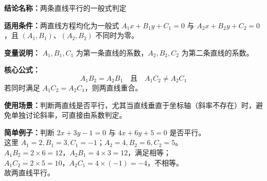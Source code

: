 \textbf{结论名称：}两条直线平行的一般式判定

\textbf{适用条件：}两直线方程均化为一般式 \(A_1x+B_1y+C_1=0\) 与 \(A_2x+B_2y+C_2=0\)，且 \((A_1,B_1)\)、\((A_2,B_2)\) 不同时为零。

\textbf{变量说明：} \(A_1,B_1,C_1\) 为第一条直线的系数，\(A_2,B_2,C_2\) 为第二条直线的系数。

\textbf{核心公式：}
\[
\boxed{ A_1B_2 = A_2B_1 \quad \text{且} \quad A_1C_2 \neq A_2C_1 }
\]
若同时满足 \(A_1C_2 = A_2C_1\)，则两直线重合。

\textbf{使用场景：}判断两直线是否平行，尤其当直线垂直于坐标轴（斜率不存在）时，避免单独讨论斜率，可直接由系数判定。

\textbf{简单例子：}判断 \(2x+3y-1=0\) 与 \(4x+6y+5=0\) 是否平行。\\
这里 \(A_1=2,B_1=3,C_1=-1\)；\(A_2=4,B_2=6,C_2=5\)。\\
\(A_1B_2=2\times6=12\)，\(A_2B_1=4\times3=12\)，满足相等；\\
\(A_1C_2=2\times5=10\)，\(A_2C_1=4\times(-1)=-4\)，不相等。\\
故两直线平行。